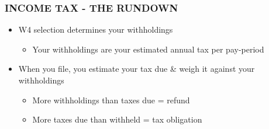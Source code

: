 \documentclass[12pt]{article}
\begin{document}
            \subsubsection{INCOME TAX - THE RUNDOWN}
                \begin{itemize}
                    \item W4 selection determines your withholdings
                        \begin{itemize}
                            \item Your withholdings are your estimated annual tax per pay-period
                        \end{itemize}
                    \item When you file, you estimate your tax due \& weigh it against your withholdings
                        \begin{itemize}
                            \item More withholdings than taxes due = refund
                            \item More taxes due than withheld = tax obligation
                        \end{itemize}
                \end{itemize}
\end{document}

